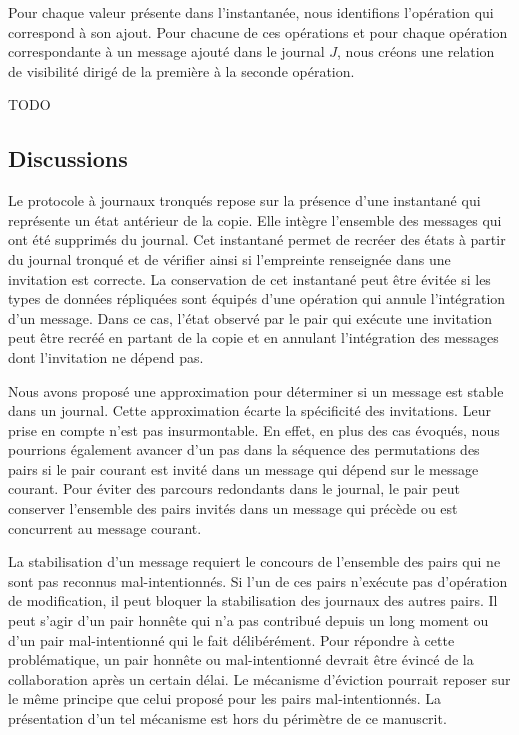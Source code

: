 Pour chaque valeur présente dans l'instantanée, nous identifions l'opération qui correspond à son ajout.
Pour chacune de ces opérations et pour chaque opération correspondante à un message ajouté dans le journal $J$, nous créons une relation de visibilité dirigé de la première à la seconde opération.

TODO


\subsection{Discussions}

Le protocole à journaux tronqués repose sur la présence d'une instantané qui représente un état antérieur de la copie.
Elle intègre l'ensemble des messages qui ont été supprimés du journal.
Cet instantané permet de recréer des états à partir du journal tronqué et de vérifier ainsi si l'empreinte renseignée dans une invitation est correcte.
La conservation de cet instantané peut être évitée si les types de données répliquées sont équipés d'une opération qui annule l'intégration d'un message.
Dans ce cas, l'état observé par le pair qui exécute une invitation peut être recréé en partant de la copie et en annulant l'intégration des messages dont l'invitation ne dépend pas.

Nous avons proposé une approximation pour déterminer si un message est stable dans un journal.
Cette approximation écarte la spécificité des invitations.
Leur prise en compte n'est pas insurmontable.
En effet, en plus des cas évoqués, nous pourrions également avancer d'un pas dans la séquence des permutations des pairs si le pair courant est invité dans un message qui dépend sur le message courant.
Pour éviter des parcours redondants dans le journal, le pair peut conserver l'ensemble des pairs invités dans un message qui précède ou est concurrent au message courant.

La stabilisation d'un message requiert le concours de l'ensemble des pairs qui ne sont pas reconnus mal-intentionnés.
Si l'un de ces pairs n'exécute pas d'opération de modification, il peut bloquer la stabilisation des journaux des autres pairs.
Il peut s'agir d'un pair honnête qui n'a pas contribué depuis un long moment ou d'un pair mal-intentionné qui le fait délibérément.
Pour répondre à cette problématique, un pair honnête ou mal-intentionné devrait être évincé de la collaboration après un certain délai.
Le mécanisme d'éviction pourrait reposer sur le même principe que celui proposé pour les pairs mal-intentionnés.
La présentation d'un tel mécanisme est hors du périmètre de ce manuscrit.


